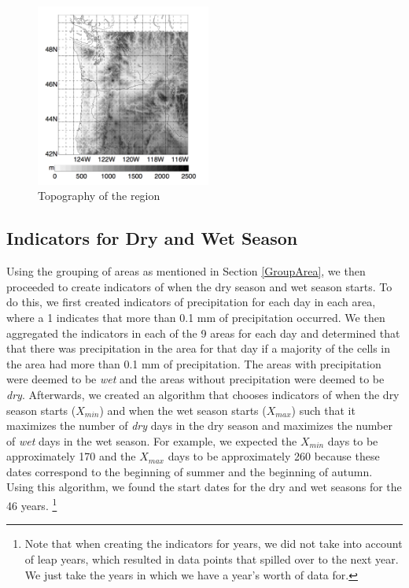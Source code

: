 \documentclass{article}
\begin{document}
\begin{figure}[h!]
\centering
\includegraphics[width = .4\textwidth, height = 6cm]{topography}
\caption{Topography of the region }
\label{fig:area4}
\end{figure}


\subsection{Indicators for Dry and Wet Season}
Using the grouping of areas as mentioned in Section \ref{GroupArea}, we then proceeded to create indicators of when the dry season and wet season starts. To do this, we first created indicators of precipitation for each day in each area, where a 1 indicates that more than 0.1 mm of precipitation occurred.  We then aggregated the indicators in each of the 9 areas for each day and determined that that there was precipitation in the area for that day if a majority of the cells in the area had more than 0.1 mm of precipitation. The areas with precipitation were deemed to be \textit{wet} and the areas without precipitation were deemed to be \textit{dry}. Afterwards, we created an algorithm that chooses indicators of when the dry season starts ($X_{min}$) and when the wet season starts ($X_{max}$) such that it maximizes the number of \textit{dry} days in the dry season and maximizes the number of \textit{wet} days in the wet season. For example, we expected the $X_{min}$ days to be approximately 170 and the $X_{max}$ days to be approximately 260 because these dates correspond to the beginning of summer and the beginning of autumn. Using this algorithm, we found the start dates for the dry and wet seasons for the 46 years. \footnote{Note that when creating the indicators for years, we did not take into account of leap years, which resulted in data points that spilled over to the next year. We just take the years in which we have a year's worth of data for.}
\end{document}
